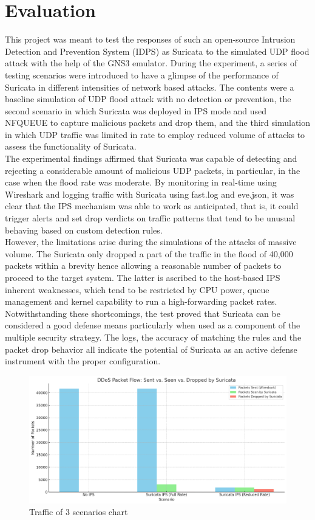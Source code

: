 \chapter{Evaluation}
This project was meant to test the responses of such an open-source Intrusion Detection and Prevention System (IDPS) as Suricata to the simulated UDP flood attack with the help of the GNS3 emulator. During the experiment, a series of testing scenarios were introduced to have a glimpse of the performance of Suricata in different intensities of network based attacks. The contents were a baseline simulation of UDP flood attack with no detection or prevention, the second scenario in which Suricata was deployed in IPS mode and used NFQUEUE to capture malicious packets and drop them, and the third simulation in which UDP traffic was limited in rate to employ reduced volume of attacks to assess the functionality of Suricata.
\\
The experimental findings affirmed that Suricata was capable of detecting and rejecting a considerable amount of malicious UDP packets, in particular, in the case when the flood rate was moderate. By monitoring in real-time using Wireshark and logging traffic with Suricata using fast.log and eve.json, it was clear that the IPS mechanism was able to work as anticipated, that is, it could trigger alerts and set drop verdicts on traffic patterns that tend to be unusual behaving based on custom detection rules.
\\
However, the limitations arise during the simulations of the attacks of massive volume. The Suricata only dropped a part of the traffic in the flood of 40,000 packets within a brevity hence allowing a reasonable number of packets to proceed to the target system. The latter is ascribed to the host-based IPS inherent weaknesses, which tend to be restricted by CPU power, queue management and kernel capability to run a high-forwarding packet rates. Notwithstanding these shortcomings, the test proved that Suricata can be considered a good defense means particularly when used as a component of the multiple security strategy. The logs, the accuracy of matching the rules and the packet drop behavior all indicate the potential of Suricata as an active defense instrument with the proper configuration.
\pagebreak
\begin{figure}[!htb]
    \centering
    \includegraphics[scale=0.2]{thesis/evaluation.png}
    \caption{Traffic of 3 scenarios chart}
    \label{fig:enter-label}
\end{figure}
